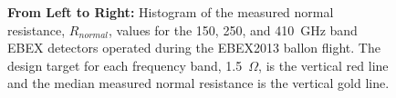 \documentclass[../EBEXPaper2.tex]{subfiles}
\begin{document}
\begin{figure}[ht!]
\centering
{}
\caption{\textbf{From Left to Right:} Histogram of the measured normal resistance, $R_{normal}$, values for the 150, 250, and 410~GHz band \ac{EBEX} detectors operated during the \ac{EBEX2013} ballon flight. The design target for each frequency band, 1.5~$\Omega$, is the vertical red line and the median measured normal resistance is the vertical gold line.}
\label{fig:rn_histograms}
\end{figure}
\end{document}
